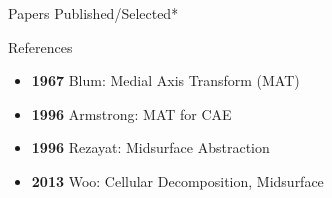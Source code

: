 \documentclass[final]{beamer}
\newlength{\onecolumnwidth}
\begin{document}
\begin{frame}[t]
\begin{columns}[t]
\begin{column}{\onecolumnwidth}
\begin{block}{Papers Published/Selected*}
\begin{itemize}
		\end{itemize} 
		
	\end{block}

	\begin{block}{References}

			\begin{itemize}
				\item \textbf{1967} Blum: Medial Axis Transform (MAT)
				\item \textbf{1996} Armstrong: MAT for CAE
				\item \textbf{1996} Rezayat: Midsurface Abstraction
				\item \textbf{2013} Woo: Cellular Decomposition, Midsurface
			
			\end{itemize} 	

	\end{block}

\end{column}


\end{columns}
\end{frame}
\end{document}
